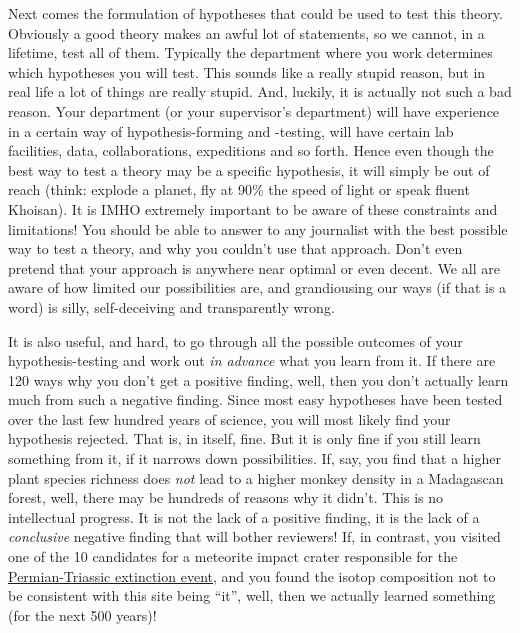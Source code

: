 Next comes the formulation of hypotheses that could be used to test this theory. Obviously a good theory makes an awful lot of statements, so we cannot, in a lifetime, test all of them. Typically the department where you work determines which hypotheses you will test. This sounds like a really stupid reason, but in real life a lot of things are really stupid. And, luckily, it is actually not such a bad reason. Your department (or your supervisor's department) will have experience in a certain way of hypothesis-forming and -testing, will have certain lab facilities, data, collaborations, expeditions and so forth. Hence even though the best way to test a theory may be a specific hypothesis, it will simply be out of reach (think: explode a planet, fly at 90\% the speed of light or speak fluent Khoisan). It is IMHO extremely important to be aware of these constraints and limitations! You should be able to answer to any journalist with the best possible way to test a theory, and why you couldn't use that approach. Don't even pretend that your approach is anywhere near optimal or even decent. We all are aware of how limited our possibilities are, and grandiousing our ways (if that is a word) is silly, self-deceiving and transparently wrong.

It is also useful, and hard, to go through all the possible outcomes of your hypothesis-testing and work out \emph{in advance} what you learn from it. If there are 120 ways why you don't get a positive finding, well, then you don't actually learn much from such a negative finding. Since most easy hypotheses have been tested over the last few hundred years of science, you will most likely find your hypothesis rejected. That is, in itself, fine. But it is only fine if you still learn something from it, if it narrows down possibilities. If, say, you find that a higher plant species richness does \emph{not} lead to a higher monkey density in a Madagascan forest, well, there may be hundreds of reasons why it didn't. This is no intellectual progress. It is not the lack of a positive finding, it is the lack of a \emph{conclusive} negative finding that will bother reviewers! If, in contrast, you visited one of the 10 candidates for a meteorite impact crater responsible for the \href{https://en.wikipedia.org/wiki/Permian%E2%80%93Triassic_extinction_event}{Permian-Triassic extinction event}, 
and you found the isotop composition not to be consistent with this site being ``it'', well, then we actually learned something (for the next 500 years)!

